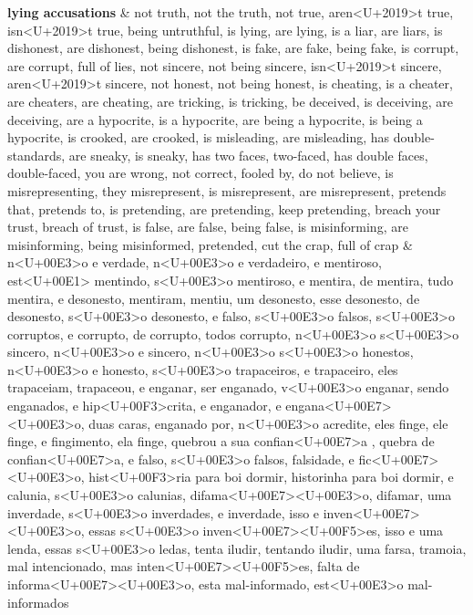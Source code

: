\documentclass[smallextended]{svjour3}       %
\begin{document}
\begin{landscape}
\begin{longtabu}
\textbf{lying accusations} & not truth, not the truth, not true, aren<U+2019>t true, isn<U+2019>t true, being untruthful, is lying, are lying, is a liar, are liars, is dishonest, are  dishonest, being dishonest, is fake, are fake, being fake, is corrupt, are corrupt, full of lies, not sincere, not being sincere, isn<U+2019>t sincere, aren<U+2019>t sincere, not honest, not being honest, is cheating, is a cheater, are cheaters, are cheating, are tricking, is tricking, be deceived, is deceiving, are deceiving, are a hypocrite, is a hypocrite, are being a hypocrite, is being a hypocrite, is crooked, are crooked, is misleading, are misleading, has double-standards, are sneaky, is sneaky,  has two faces, two-faced, has double faces, double-faced, you are wrong, not correct, fooled by, do not believe, is misrepresenting, they misrepresent, is misrepresent, are misrepresent, pretends that, pretends to, is pretending, are pretending, keep pretending, breach your trust, breach of trust, is false, are false, being false, is misinforming, are misinforming, being misinformed, pretended, cut the crap, full of crap & n<U+00E3>o e verdade, n<U+00E3>o e verdadeiro, e mentiroso, est<U+00E1> mentindo, s<U+00E3>o mentiroso, e mentira, de mentira, tudo mentira, e desonesto, mentiram, mentiu, um desonesto, esse desonesto, de desonesto, s<U+00E3>o desonesto, e falso, s<U+00E3>o falsos, s<U+00E3>o corruptos, e corrupto, de corrupto, todos corrupto, n<U+00E3>o s<U+00E3>o sincero, n<U+00E3>o e sincero, n<U+00E3>o s<U+00E3>o honestos, n<U+00E3>o e honesto, s<U+00E3>o trapaceiros, e trapaceiro, eles trapaceiam, trapaceou, e enganar, ser enganado, v<U+00E3>o enganar, sendo enganados, e hip<U+00F3>crita, e enganador, e engana<U+00E7><U+00E3>o, duas caras, enganado por, n<U+00E3>o acredite, eles finge, ele finge, e fingimento, ela finge, quebrou a sua confian<U+00E7>a , quebra de confian<U+00E7>a,  e falso, s<U+00E3>o falsos, falsidade, e fic<U+00E7><U+00E3>o, hist<U+00F3>ria para boi dormir, historinha para boi dormir, e calunia, s<U+00E3>o calunias, difama<U+00E7><U+00E3>o, difamar, uma inverdade, s<U+00E3>o inverdades, e inverdade, isso e inven<U+00E7><U+00E3>o, essas s<U+00E3>o inven<U+00E7><U+00F5>es, isso e uma lenda, essas s<U+00E3>o ledas, tenta iludir, tentando iludir, uma farsa, tramoia, mal intencionado, mas inten<U+00E7><U+00F5>es, falta de informa<U+00E7><U+00E3>o, esta mal-informado, est<U+00E3>o mal-informados\\

\end{longtabu}
\end{landscape}
\end{document}
